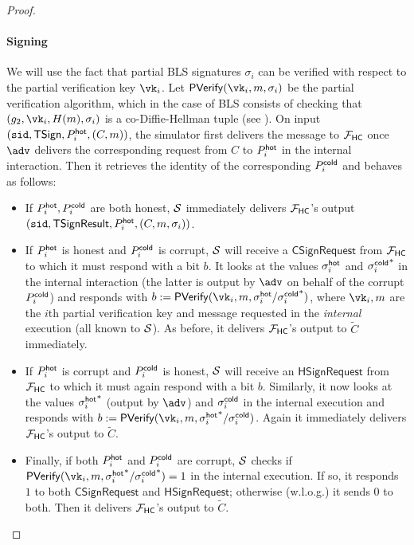 \begin{proof}
\paragraph{Signing} 
We will use the fact that partial BLS signatures $\sigma_i$ can be verified with respect to the partial verification key $\vk_i$. Let $\mathsf{P}\vrfy(\vk_i, m, \sigma_i)$ be the partial verification algorithm, which in the case of BLS consists of checking that $(g_2, \vk_i, \blshash(m), \sigma_i)$ is a co-Diffie-Hellman tuple (see ).
On input $(\texttt{sid}, \mathsf{TSign}, P_i^{\mathsf{hot}}, (C, m))$, the simulator first delivers the message to $\mathcal{F}_\mathsf{HC}$ once $\adv$ delivers the corresponding request from $C$ to $P_i^{\mathsf{hot}}$ in the internal interaction. Then it retrieves the identity of the corresponding $P_i^{\mathsf{cold}}$ and behaves as follows:
\begin{itemize}
    \item If $P_i^{\mathsf{hot}}, P_i^{\mathsf{cold}}$ are both honest, $\mathcal{S}$ immediately delivers $\mathcal{F}_\mathsf{HC}$'s output $(\texttt{sid},\allowbreak \mathsf{TSignResult}, P_i^{\mathsf{hot}}, (C, m, \sigma_i))$.
    \item If $P_i^{\mathsf{hot}}$ is honest and $P_i^{\mathsf{cold}}$ is corrupt, $\mathcal{S}$ will receive a $\mathsf{CSignRequest}$ from $\mathcal{F}_\mathsf{HC}$ to which it must respond with a bit $b$. It looks at the values $\sigma_i^{\mathsf{hot}}$ and ${\sigma_i^{\mathsf{cold}}}^*$ in the internal interaction (the latter is output by $\adv$ on behalf of the corrupt $P_i^{\mathsf{cold}}$) and responds with $b := \mathsf{P}\vrfy(\vk_i, m, \sigma_i^\hot/{\sigma_i^\cold}^*)$, where $\vk_i, m$ are the $i$th partial verification key and message requested in the \emph{internal} execution (all known to $\mathcal{S}$). As before, it delivers $\mathcal{F}_\mathsf{HC}$'s output to $\tilde{C}$ immediately.
    \item If $P_i^{\mathsf{hot}}$ is corrupt and $P_i^{\mathsf{cold}}$ is honest, $\mathcal{S}$ will receive an $\mathsf{HSignRequest}$ from $\mathcal{F}_\mathsf{HC}$ to which it must again respond with a bit $b$. Similarly, it now looks at the values ${\sigma_i^{\mathsf{hot}}}^*$ (output by $\adv$) and $\sigma_i^{\mathsf{cold}}$ in the internal execution and responds with $b := \mathsf{P}\vrfy(\vk_i, m, {\sigma_i^\hot}^*/\sigma_i^\cold)$. Again it immediately delivers $\mathcal{F}_\mathsf{HC}$'s output to $\tilde{C}$.
    \item Finally, if both $P_i^{\mathsf{hot}}$ and $P_i^{\mathsf{cold}}$ are corrupt, $\mathcal{S}$ checks if $\mathsf{P}\vrfy(\vk_i, m,\allowbreak {\sigma_i^\hot}^*/{\sigma_i^\cold}^*) = 1$ in the internal execution. If so, it responds $1$ to both $\mathsf{CSignRequest}$ and $\mathsf{HSignRequest}$; otherwise (w.l.o.g.) it sends $0$ to both. Then it delivers $\mathcal{F}_\mathsf{HC}$'s output  to $\tilde{C}$.
\end{itemize}


\end{proof}
